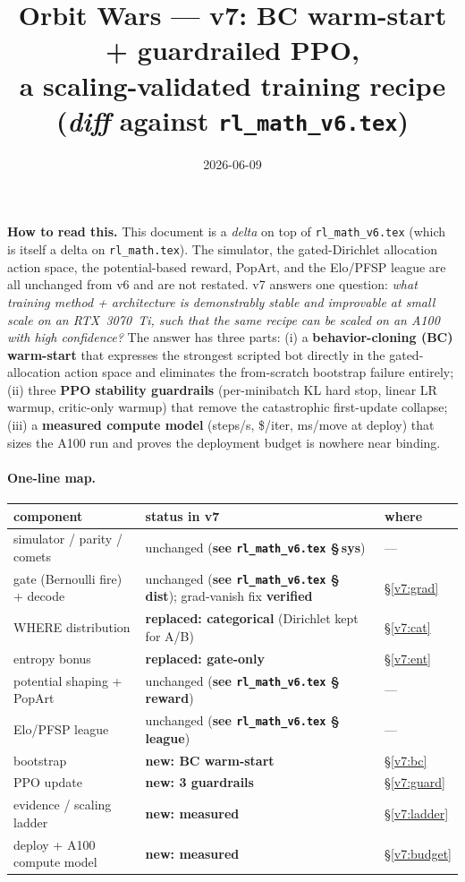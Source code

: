 \documentclass[11pt]{article}
\title{\textbf{Orbit Wars --- v7: BC warm-start + guardrailed PPO,\\ a scaling-validated training recipe (\emph{diff} against \texttt{rl\_math\_v6.tex})}}
\author{}
\date{2026-06-09}
\newcommand{\vsixref}[1]{\textbf{see \texttt{rl\_math\_v6.tex} \S\,#1}}
\begin{document}
\maketitle

\noindent\textbf{How to read this.} This document is a \emph{delta} on top of
\texttt{rl\_math\_v6.tex} (which is itself a delta on \texttt{rl\_math.tex}). The simulator, the
gated-Dirichlet allocation action space, the potential-based reward, PopArt, and the Elo/PFSP league
are all unchanged from v6 and are not restated. v7 answers one question:
\emph{what training method + architecture is demonstrably stable and improvable at small scale on an
RTX~3070~Ti, such that the same recipe can be scaled on an A100 with high confidence?}
The answer has three parts: (i) a \textbf{behavior-cloning (BC) warm-start} that expresses the
strongest scripted bot directly in the gated-allocation action space and eliminates the from-scratch
bootstrap failure entirely; (ii) three \textbf{PPO stability guardrails} (per-minibatch KL hard stop,
linear LR warmup, critic-only warmup) that remove the catastrophic first-update collapse;
(iii) a \textbf{measured compute model} (steps/s, \$/iter, ms/move at deploy) that sizes the A100 run
and proves the deployment budget is nowhere near binding.

\paragraph{One-line map.}
\begin{center}
\small
\begin{tabular}{@{}lll@{}}
\toprule
component & status in v7 & where \\
\midrule
simulator / parity / comets        & unchanged (\vsixref{sys})        & --- \\
gate (Bernoulli fire) + decode     & unchanged (\vsixref{dist}); grad-vanish fix \textbf{verified} & \S\ref{v7:grad} \\
WHERE distribution                 & \textbf{replaced: categorical} (Dirichlet kept for A/B) & \S\ref{v7:cat} \\
entropy bonus                      & \textbf{replaced: gate-only}     & \S\ref{v7:ent} \\
potential shaping + PopArt         & unchanged (\vsixref{reward})     & --- \\
Elo/PFSP league                    & unchanged (\vsixref{league})     & --- \\
bootstrap                          & \textbf{new: BC warm-start}      & \S\ref{v7:bc} \\
PPO update                         & \textbf{new: 3 guardrails}       & \S\ref{v7:guard} \\
evidence / scaling ladder          & \textbf{new: measured}           & \S\ref{v7:ladder} \\
deploy + A100 compute model        & \textbf{new: measured}           & \S\ref{v7:budget} \\
\bottomrule
\end{tabular}
\end{center}
\end{document}
